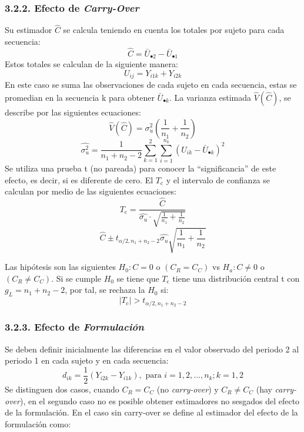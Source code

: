 \documentclass[]{article}
\begin{document}
\subsubsection{\texorpdfstring{3.2.2. Efecto de
\emph{Carry-Over}}{3.2.2. Efecto de Carry-Over}}\label{efecto-de-carry-over}

Su estimador \(\hat{C}\) se calcula teniendo en cuenta los totales por
sujeto para cada secuencia:
\[\hat{C} = \bar{U}_{\bullet2} - \bar{U}_{\bullet1}\] Estos totales se
calculan de la siguiente manera:\\
\[U_{ij} = Y_{i1k}+Y_{i2k}\] En este caso se suma las observaciones de
cada sujeto en cada secuencia, estas se promedian en la secuencia k para
obtener \(\bar{U}_{\bullet k}\). La varianza estimada
\(\hat{V}(\hat{C})\), se describe por las siguientes ecuaciones:
\[\hat{V}(\hat{C}) = \sigma_{u}^{2}\left (\frac{1}{n_{1}}+\frac{1}{n_{2}} \right )\]
\[\hat{\sigma_{u}^{2}} = \frac{1}{n_{1}+n_{2}-2} \sum_{k=1}^{2}\sum_{i=1}^{n_{k}}{(U_{ik}-\bar{U}_{\bullet k})^{2}}\]
Se utiliza una prueba t (no pareada) para conocer la ``significancia''
de este efecto, es decir, si es diferente de cero. El \(T_{\textrm{c}}\)
y el intervalo de confianza se calculan por medio de las siguientes
ecuaciones:\\
\[T_{\textrm{c}} = \frac{\hat{C}}{\hat{\sigma_{u}}\cdot\sqrt{\frac{1}{n_{1}}+\frac{1}{n_{2}}}}\]
\[\hat{C} \pm t_{\alpha/2, n_{1}+n_{2}-2} \hat{\sigma_{u}} \sqrt{\frac{1}{n_{1}}+\frac{1}{n_{2}}}\]

Las hipótesis son las siguientes \(H_{0}: C=0\) o \((C_{R} = C_{C})\) vs
\(H_{a}: C \neq 0\) o \((C_{R} \neq C_{C})\). Si se cumple \(H_{0}\) se
tiene que \(T_{\textrm{c}}\) tiene una distribución central t con
\(g_{L} = n_{1}+n_{2}-2\), por tal, se rechaza la \(H_{0}\) si:\\
\[\left |T_{\textrm{c}} \right | > t_{\alpha/2,n_{1}+n_{2}-2}\]

\subsubsection{\texorpdfstring{3.2.3. Efecto de
\emph{Formulación}}{3.2.3. Efecto de Formulación}}\label{efecto-de-formulacion}

Se deben definir inicialmente las diferencias en el valor observado del
periodo 2 al periodo 1 en cada sujeto y en cada secuencia:\\
\[d_{ik} = \frac{1}{2} \left ( Y_{i2k} -Y_{i1k}\right ),\textrm{ para }i=1,2,...,n_{k}; k = 1,2\]
Se distinguen dos casos, cuando \(C_{R}=C_{C}\) (no \emph{carry-over}) y
\(C_{R} \neq C_{C}\) (hay \emph{carry-over}), en el segundo caso no es
posible obtener estimadores no sesgados del efecto de la formulación. En
el caso sin carry-over se define al estimador del efecto de la
formulación como:
\end{document}
